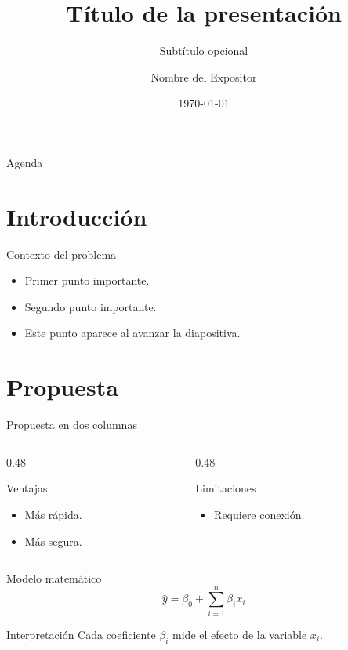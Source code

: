 \documentclass[aspectratio=169]{beamer}
\title[Título corto]{Título de la presentación}
\subtitle{Subtítulo opcional}
\author{Nombre del Expositor}
\institute{Universidad}
\date{\today}
\begin{document}
\begin{frame}
  \titlepage
\end{frame}

\begin{frame}{Agenda}
  \tableofcontents
\end{frame}

\section{Introducción}
\begin{frame}{Contexto del problema}
  \begin{itemize}
    \item Primer punto importante.
    \item Segundo punto importante.
    \pause
    \item Este punto aparece al avanzar la diapositiva.
  \end{itemize}
\end{frame}

\section{Propuesta}
\begin{frame}{Propuesta en dos columnas}
  \begin{columns}[T]
    \begin{column}{0.48\textwidth}
      \begin{block}{Ventajas}
        \begin{itemize}
          \item Más rápida.
          \item Más segura.
        \end{itemize}
      \end{block}
    \end{column}
    \begin{column}{0.48\textwidth}
      \begin{alertblock}{Limitaciones}
        \begin{itemize}
          \item Requiere conexión.
        \end{itemize}
      \end{alertblock}
    \end{column}
  \end{columns}
\end{frame}

\begin{frame}{Modelo matemático}
  \begin{equation*}
    \hat{y} = \beta_0 + \sum_{i=1}^{n} \beta_i x_i
  \end{equation*}
  \begin{exampleblock}{Interpretación}
    Cada coeficiente $\beta_i$ mide el efecto de la variable $x_i$.
  \end{exampleblock}
\end{frame}
\end{document}
